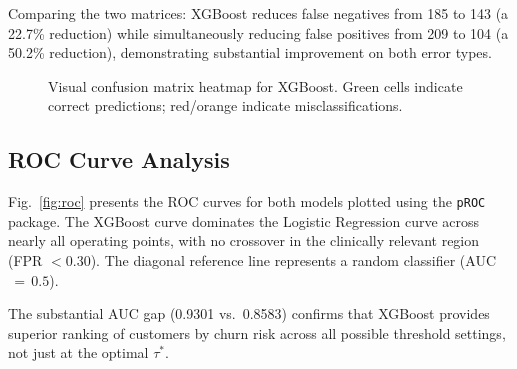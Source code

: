 \documentclass[10pt, conference, letterpaper]{IEEEtran}
\begin{document}
Comparing the two matrices: XGBoost reduces false negatives from 185 to 143 (a 22.7\% reduction) while simultaneously reducing false positives from 209 to 104 (a 50.2\% reduction), demonstrating substantial improvement on both error types.

\begin{figure}[htbp]
\centering
{}
\caption{Visual confusion matrix heatmap for XGBoost. Green cells indicate correct predictions; red/orange indicate misclassifications.}
\label{fig:cm_visual}
\end{figure}

\subsection{ROC Curve Analysis}

Fig.~\ref{fig:roc} presents the ROC curves for both models plotted using the \texttt{pROC} package. The XGBoost curve dominates the Logistic Regression curve across nearly all operating points, with no crossover in the clinically relevant region (FPR $< 0.30$). The diagonal reference line represents a random classifier (AUC$\,{=}\,0.5$).

The substantial AUC gap (0.9301 vs.\ 0.8583) confirms that XGBoost provides superior ranking of customers by churn risk across all possible threshold settings, not just at the optimal $\tau^*$.
\end{document}
